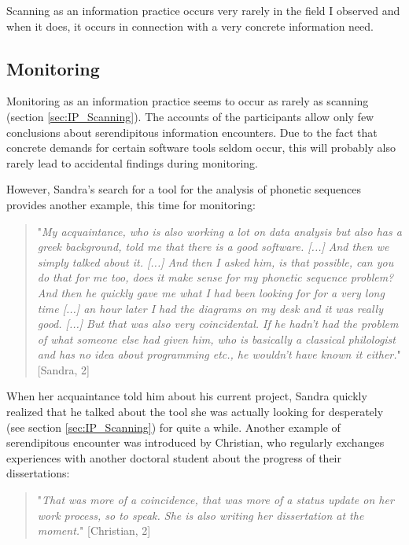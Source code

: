 \documentclass[12pt, a4paper, titlepage, oneside, abstract=true, toc=listof, toc=bibliography]{scrreprt}
\begin{document}
{%
Scanning as an information practice occurs very rarely in the field I observed and when it does, it occurs in connection with a very concrete information need. 

\subsection{Monitoring}
\label{sec:IP_Monitoring}
Monitoring as an information practice seems to occur as rarely as scanning (section \ref{sec:IP_Scanning}). The accounts of the participants allow only few conclusions about serendipitous information encounters. Due to the fact that concrete demands for certain software tools seldom occur, this will probably also rarely lead to accidental findings during monitoring. 

However, Sandra's search for a tool for the analysis of phonetic sequences provides another example, this time for monitoring:

\begin{quotation}
"\textit{My acquaintance, who is also working a lot on data analysis but also has a greek background, told me that there is a good software. [...] And then we simply talked about it. [...] And then I asked him, is that possible, can you do that for me too, does it make sense for my phonetic sequence problem? And then he quickly gave me what I had been looking for for a very long time [...] an hour later I had the diagrams on my desk and it was really good. [...] But that was also very coincidental. If he hadn't had the problem of what someone else had given him, who is basically a classical philologist and has no idea about programming etc., he wouldn't have known it either.}" [Sandra, 2]
\end{quotation}

When her acquaintance told him about his current project, Sandra quickly realized that he talked about the tool she was actually looking for desperately (see section \ref{sec:IP_Scanning}) for quite a while. Another example of serendipitous encounter was introduced by Christian, who regularly exchanges experiences with another doctoral student about the progress of their dissertations:

\begin{quotation}
"\textit{That was more of a coincidence, that was more of a status update on her work process, so to speak. She is also writing her dissertation at the moment.}" [Christian, 2]
\end{quotation}

}
\end{document}
